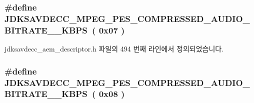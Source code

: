 \subsubsection[{\texorpdfstring{J\+D\+K\+S\+A\+V\+D\+E\+C\+C\+\_\+\+M\+P\+E\+G\+\_\+\+P\+E\+S\+\_\+\+C\+O\+M\+P\+R\+E\+S\+S\+E\+D\+\_\+\+A\+U\+D\+I\+O\+\_\+\+B\+I\+T\+R\+A\+T\+E\+\_\+64\+\_\+\+K\+B\+PS}{JDKSAVDECC_MPEG_PES_COMPRESSED_AUDIO_BITRATE_64_KBPS}}]{\setlength{\rightskip}{0pt plus 5cm}\#define J\+D\+K\+S\+A\+V\+D\+E\+C\+C\+\_\+\+M\+P\+E\+G\+\_\+\+P\+E\+S\+\_\+\+C\+O\+M\+P\+R\+E\+S\+S\+E\+D\+\_\+\+A\+U\+D\+I\+O\+\_\+\+B\+I\+T\+R\+A\+T\+E\+\_\+\_\+\+K\+B\+PS~( 0x07 )}\hypertarget{group__mpeg__pes__compressed__audio__bitrate_gab7a4f366e1fac62ee1bd10fd9baa08f0}{}\label{group__mpeg__pes__compressed__audio__bitrate_gab7a4f366e1fac62ee1bd10fd9baa08f0}


jdksavdecc\+\_\+aem\+\_\+descriptor.\+h 파일의 494 번째 라인에서 정의되었습니다.

\subsubsection[{\texorpdfstring{J\+D\+K\+S\+A\+V\+D\+E\+C\+C\+\_\+\+M\+P\+E\+G\+\_\+\+P\+E\+S\+\_\+\+C\+O\+M\+P\+R\+E\+S\+S\+E\+D\+\_\+\+A\+U\+D\+I\+O\+\_\+\+B\+I\+T\+R\+A\+T\+E\+\_\+80\+\_\+\+K\+B\+PS}{JDKSAVDECC_MPEG_PES_COMPRESSED_AUDIO_BITRATE_80_KBPS}}]{\setlength{\rightskip}{0pt plus 5cm}\#define J\+D\+K\+S\+A\+V\+D\+E\+C\+C\+\_\+\+M\+P\+E\+G\+\_\+\+P\+E\+S\+\_\+\+C\+O\+M\+P\+R\+E\+S\+S\+E\+D\+\_\+\+A\+U\+D\+I\+O\+\_\+\+B\+I\+T\+R\+A\+T\+E\+\_\+\_\+\+K\+B\+PS~( 0x08 )}\hypertarget{group__mpeg__pes__compressed__audio__bitrate_ga82a6af5b709fa3df2a033ce376458dd7}{}\label{group__mpeg__pes__compressed__audio__bitrate_ga82a6af5b709fa3df2a033ce376458dd7}



